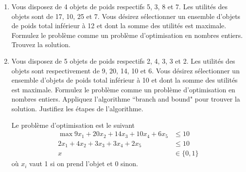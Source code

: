 \begin{enumerate}
  \item Vous disposez de 4 objets de poids respectifs 5, 3, 8 et 7. Les utilités des
    objets sont de 17, 10, 25 et 7. Vous désirez sélectionner un ensemble d'objets de poids total inférieur  à 12 et dont la somme
    des utilités est maximale.  Formulez le problème comme un problème d'optimisation en nombres entiers. Trouvez la solution.



  \item Vous disposez de 5 objets de poids respectifs 2, 4, 3, 3 et 2. Les
    utilités des objets sont respectivement de 9, 20, 14, 10 et 6. Vous désirez
    sélectionner un ensemble d'objets de poids total inférieur  à 10
    et dont la somme des utilités est maximale.  Formulez le problème
    comme un problème d'optimisation en nombres entiers. Appliquez l'algorithme ``branch and bound" pour trouver la
    solution. Justifiez les étapes de l'algorithme.

    \begin{solution}
      Le problème d'optimisation est le suivant
      \begin{align*}
        \max 9x_1 + 20x_2 + 14x_3 + 10x_4 + 6x_5 & \leq 10\\
        2x_1 + 4x_2 + 3x_3 + 3x_4 + 2x_5 & \leq 10\\
        x & \in \{0,1\}
      \end{align*}
      où $x_i$ vaut 1 si on prend l'objet et 0 sinon.


\end{solution}
\end{enumerate}
